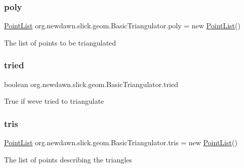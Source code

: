 \subsubsection{\texorpdfstring{poly}{poly}}
{\footnotesize\ttfamily \mbox{\hyperlink{classorg_1_1newdawn_1_1slick_1_1geom_1_1_basic_triangulator_1_1_point_list}{Point\+List}} org.\+newdawn.\+slick.\+geom.\+Basic\+Triangulator.\+poly = new \mbox{\hyperlink{classorg_1_1newdawn_1_1slick_1_1geom_1_1_basic_triangulator_1_1_point_list}{Point\+List}}()\hspace{0.3cm}{\ttfamily [private]}}

The list of points to be triangulated \mbox{\label{classorg_1_1newdawn_1_1slick_1_1geom_1_1_basic_triangulator_adc09d95b55a0bca60e6d63df97735ce4}} 
\subsubsection{\texorpdfstring{tried}{tried}}
{\footnotesize\ttfamily boolean org.\+newdawn.\+slick.\+geom.\+Basic\+Triangulator.\+tried\hspace{0.3cm}{\ttfamily [private]}}

True if we\textquotesingle{}ve tried to triangulate \mbox{\label{classorg_1_1newdawn_1_1slick_1_1geom_1_1_basic_triangulator_af35de217f51e551e95179a91b06c59f2}} 
\subsubsection{\texorpdfstring{tris}{tris}}
{\footnotesize\ttfamily \mbox{\hyperlink{classorg_1_1newdawn_1_1slick_1_1geom_1_1_basic_triangulator_1_1_point_list}{Point\+List}} org.\+newdawn.\+slick.\+geom.\+Basic\+Triangulator.\+tris = new \mbox{\hyperlink{classorg_1_1newdawn_1_1slick_1_1geom_1_1_basic_triangulator_1_1_point_list}{Point\+List}}()\hspace{0.3cm}{\ttfamily [private]}}

The list of points describing the triangles 
